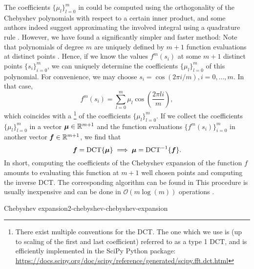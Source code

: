 The coefficients $\{\mu_l\}_{l=0}^m$ in 
could be computed using the orthogonality of the Chebyshev polynomials with respect
to a certain inner product, and some authors indeed suggest approximating the
involved integral using a quadrature rule \cite[algorithm~1]{lin2017randomized}. However, we
have found a significantly simpler and faster method: Note that polynomials of
degree $m$ are uniquely defined by $m+1$ function evaluations at distinct points \cite{gauss1799demonstratio}.
Hence, if we know the values $f^m(s_i)$ at some $m+1$ distinct points 
$\{s_i\}_{i=0}^m$, we can uniquely determine the coefficients $\{\mu_l\}_{l=0}^m$
of this polynomial. For convenience, we may choose $s_i = \cos(2 \pi i/m), i=0,\dots,m$.
In that case,
\begin{equation}
    f^m(s_i) = \sum_{l=0}^{m} \mu_l \cos\left(\frac{2 \pi l i}{m}\right),
    \label{equ:2-chebyshev-chebyshev-nodes-evaluation}
\end{equation}
which coincides with a \footnote{There exist multiple conventions for the DCT.
The one which we use is (up to scaling of the first and last coefficient)
referred to as a type 1 DCT, and is efficiently implemented in the SciPy Python package:
\url{https://docs.scipy.org/doc/scipy/reference/generated/scipy.fft.dct.html}} of the coefficients $\{\mu_l\}_{l=0}^m$.
If we collect the coefficients $\{\mu_l\}_{l=0}^{m}$ in a vector $\boldsymbol{\mu} \in \mathbb{R}^{m+1}$ 
and the function evaluations $\{f^m(s_i)\}_{i=0}^{m}$ in another
vector $\boldsymbol{f} \in \mathbb{R}^{m+1}$, we find that
\begin{equation}
    \boldsymbol{f} = \operatorname{DCT} \{ \boldsymbol{\mu} \} \implies \boldsymbol{\mu} = \operatorname{DCT}^{-1}\{ \boldsymbol{f} \}.
    \label{equ:2-chebyshev-chebyshev-DCT}
\end{equation}
In short, computing the coefficients of the Chebyshev expansion 
of the function $f$ amounts to evaluating this function at $m+1$ well
chosen points and computing the inverse \gls{DCT}. The corresponding algorithm
can be found in 
This procedure is usually inexpensive and can be done in $\mathcal{O}(m \log(m))$
operations \cite{makhoul1980fct}.

\begin{algo}{Chebyshev expansion}{2-chebyshev-chebyshev-expansion}
    
\end{algo}


